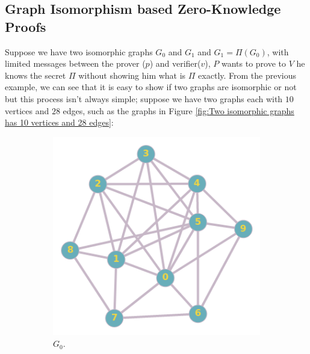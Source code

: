 \documentclass[12pt,a4paper]{article}
\begin{document}
\subsection{Graph Isomorphism based Zero-Knowledge Proofs}
Suppose we have two isomorphic graphs $G_0$ and $G_1$ and $G_1=\Pi(G_0)$, with limited messages between the prover ($p$) and verifier($v$), $P$ wants to prove to $V$ he knows the secret $\Pi$ without showing him what is $\Pi$ exactly.
From the previous example, we can see that it is easy to show if two graphs are isomorphic or not but this process isn’t always simple; suppose we have two graphs each with $10$ vertices and $28$ edges, such as the graphs in Figure \ref{fig:Two isomorphic graphs has 10 vertices and 28 edges}:
\begin{figure}[h!]
	\centering
	\begin{subfigure}[b]{.39\linewidth}
		\includegraphics[width=\linewidth]{ex2_1.png}
		\caption{$G_0$.}
	\end{subfigure}
	\begin{subfigure}[b]{.39\linewidth}

\end{subfigure}
\end{figure}
\end{document}
